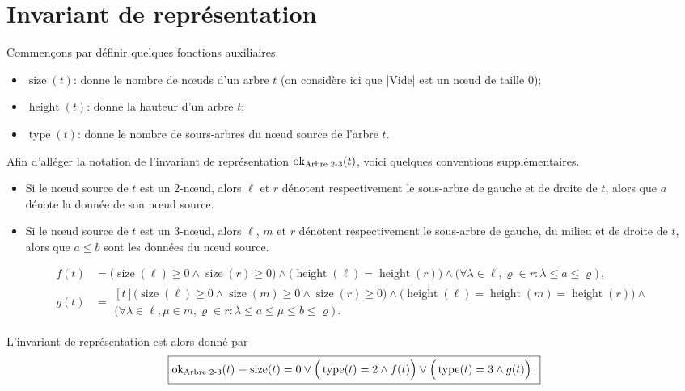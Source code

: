 \documentclass{elsarticle}
\newcommand{\ok}{\ensuremath{\textnormal{ok}_{\textnormal{Arbre 2-3}}}}
\DeclareMathOperator{\size}{size}
\DeclareMathOperator{\height}{height}
\DeclareMathOperator{\type}{type}
\renewcommand{\rho}{\varrho}
\begin{document}
\section{Invariant de représentation}
Commençons par définir quelques fonctions auxiliaires:
\begin{itemize}
	\item \(\size(t)\): donne le nombre de n\oe{}uds d'un arbre \(t\) (on considère ici que \inlinedafny|Vide| est un n\oe{}ud de taille \(0\));
	\item \(\height(t)\): donne la hauteur d'un arbre \(t\);
	\item \(\type(t)\): donne le nombre de sours-arbres du n\oe{}ud source de l'arbre \(t\).
\end{itemize}
Afin d'alléger la notation de l'invariant de représentation \(\ok(t)\), voici quelques conventions supplémentaires.
\begin{itemize}
	\item Si le n\oe{}ud source de \(t\) est un 2-n\oe{}ud, alors \(\ell\) et \(r\) dénotent respectivement le sous-arbre de gauche et de droite de \(t\), alors que \(a\) dénote la donnée de son n\oe{}ud source.
	\item Si le n\oe{}ud source de \(t\) est un 3-n\oe{}ud, alors \(\ell\), \(m\) et \(r\) dénotent respectivement le sous-arbre de gauche, du milieu et de droite de \(t\), alors que \(a \le b\) sont les données du n\oe{}ud source.
\end{itemize}
\begin{align}
f(t) &= \Big(\size(\ell) \ge 0 \land \size(r) \ge 0\Big) \land \Big(\height(\ell) = \height(r)\Big) \land \Big(\forall \lambda \in \ell, \rho \in r : \lambda \le a \le \rho \Big)\,,\\
g(t) &= \begin{multlined}[t] \Big(\size(\ell) \ge 0 \land \size(m) \ge 0 \land \size(r) \ge 0\Big) \land \Big(\height(\ell) = \height(m) = \height(r)\Big) \land {}\\ \Big(\forall \lambda \in \ell, \mu \in m, \rho \in r : \lambda \le a \le \mu \le b \le \rho \Big)\,.
\end{multlined}
\end{align}

L'invariant de représentation est alors donné par
\begin{equation}
\boxed{\ok(t) \equiv \size(t) = 0 \lor \Big(\type(t) = 2 \land f(t)\Big) \lor  \Big(\type(t) = 3 \land g(t)\Big)\,.}
\end{equation}
\end{document}
